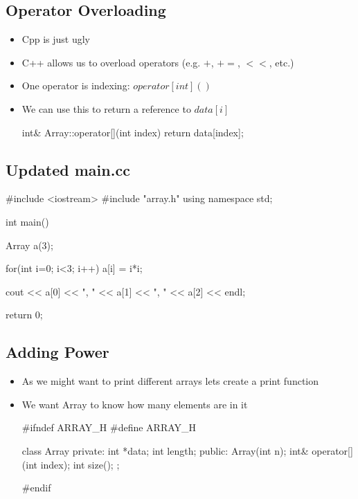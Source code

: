 
\begin{slide}
\section{Operator Overloading}

\begin{itemize}
\item Cpp is just ugly
\item C++ allows us to overload operators (e.g. \jl$+$, \jl$+=$,
  \jl$<<$, etc.)
\item One operator is indexing: \jl$operator[int]()$
\item We can use this to return a reference to \jl$data[i]$
  \begin{cpp}
int& Array::operator[](int index) {
  return data[index];
}
  \end{cpp}
\end{itemize}

\end{slide}


\begin{slide}
\section{Updated main.cc}
  
\begin{cpp}
#include <iostream>
#include "array.h"
using namespace std;

int main() {
  Array a(3);

  for(int i=0; i<3; i++) {
    a[i] = i*i;
  }

  cout << a[0] << ", " << a[1] << ", " << a[2] << endl;

  return 0;
}
\end{cpp}
\end{slide}


\begin{slide}
  \section[-2]{Adding Power}
  
  \begin{itemize}
  \item As we might want to print different arrays lets create a print
    function
  \item We want Array to know how many elements are in it
    \begin{cpp}
#ifndef ARRAY_H
#define ARRAY_H

class Array {
private:
  int *data;
  int length;
public:
  Array(int n);
  int& operator[](int index);
  int size();
};

#endif
    \end{cpp}
  \end{itemize}


\end{slide}

